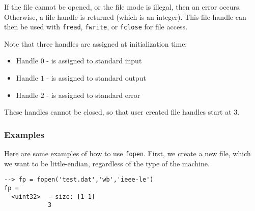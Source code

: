 If the file cannot be opened, or the file mode is illegal, then
an error occurs. Otherwise, a file handle is returned (which is
an integer).  This file handle can then be used with \verb|fread|,
\verb|fwrite|, or \verb|fclose| for file access.

Note that three handles are assigned at initialization time:
\begin{itemize}
\item Handle $0$ - is assigned to standard input
\item Handle $1$ - is assigned to standard output
\item Handle $2$ - is assigned to standard error
\end{itemize}
These handles cannot be closed, so that user created file handles start at $3$.

\subsubsection{Examples}
Here are some examples of how to use \verb|fopen|.  First, we create a new file, which we want to be little-endian, regardless of the type of the machine.
\begin{verbatim}
--> fp = fopen('test.dat','wb','ieee-le')
fp =
  <uint32>  - size: [1 1]
            3
\end{verbatim}
